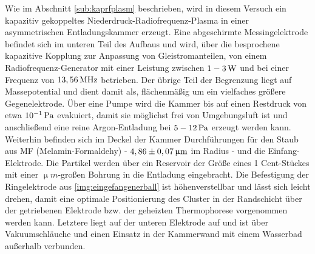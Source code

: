 \documentclass[numbers=noenddot,a4paper]{scrartcl}
\newcommand{\tenpo}[1]{ 10^{#1}}
\begin{document}
			Wie im Abschnitt \ref{sub:kaprfplasm} beschrieben, wird in diesem Versuch ein kapazitiv gekoppeltes Niederdruck-Radiofrequenz-Plasma in einer asymmetrischen Entladungskammer erzeugt. Eine abgeschirmte Messingelektrode befindet sich im unteren Teil des Aufbaus und wird, \"uber die besprochene kapazitive Kopplung zur Anpassung von Gleistromanteilen, von einem Radiofrequenz-Generator mit einer Leistung zwischen $\unit[1-3]{W}$ und bei einer Frequenz von $\unit[13,56]{MHz}$ betrieben. Der \"ubrige Teil der Begrenzung liegt auf Massepotential und dient damit als, fl\"achenm\"a{\ss}ig um ein vielfaches gr\"o{\ss}ere Gegenelektrode. \"Uber eine Pumpe wird die Kammer bis auf einen Restdruck von etwa $\unit[\tenpo{-1}]{Pa}$ evakuiert, damit sie m\"oglichst frei von Umgebungsluft ist und anschlie{\ss}end eine reine Argon-Entladung bei $\unit[5-12]{Pa}$ erzeugt werden kann.
			Weiterhin befinden sich im Deckel der Kammer Durchf\"uhrungen f\"ur den Staub aus MF (Melamin-Formaldehy) - $\unit[4,86\pm0,07]{\upmu m}$ im Radius - und die Einfang-Elektrode. Die Partikel werden \"uber ein Reservoir der Gr\"o{\ss}e eines 1 Cent-St\"uckes mit einer $\unit{\upmu m}$-gro{\ss}en Bohrung in die Entladung eingebracht. Die Befestigung der Ringelektrode aus \ref{img:eingefangenerball} ist h\"ohenverstellbar und l\"asst sich leicht drehen, damit eine optimale Positionierung des Cluster in der Randschicht \"uber der getriebenen Elektrode bzw. der geheizten Thermophorese vorgenommen werden kann. Letztere liegt auf der unteren Elektrode auf und ist \"uber Vakuumschl\"auche und einen Einsatz in der Kammerwand mit einem Wasserbad au{\ss}erhalb verbunden.
\end{document}
